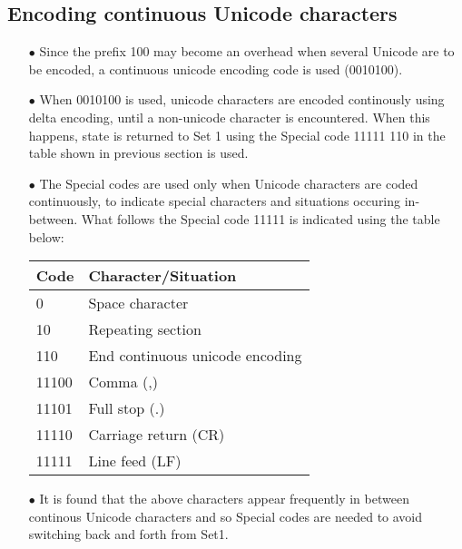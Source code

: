 \documentclass[]{article}
\begin{document}
\subsection{Encoding continuous Unicode characters}
\begin{itemize}
	\item[$\bullet$] Since the prefix 100 may become an overhead when several Unicode are to be encoded, a continuous unicode encoding code is used (0010100).
	\item[$\bullet$] When 0010100 is used, unicode characters are encoded continously using delta encoding, until a non-unicode character is encountered.  When this happens, state is returned to Set 1 using the Special code 11111 110 in the table shown in previous section is used.
	\item[$\bullet$] The Special codes are used only when Unicode characters are coded continuously, to indicate special characters and situations occuring in-between. What follows the Special code 11111 is indicated using the table below:
	\item[] \begin{tabular}{ | l | l |} \hline
	﻿\textbf{Code} & ﻿\textbf{Character/Situation} \\ \hline
	0 & Space character \\ \hline
	10 & Repeating section \\ \hline
	110 & End continuous unicode encoding \\ \hline
	11100 & Comma (,) \\ \hline
	11101 & Full stop (.) \\ \hline
	11110 & Carriage return (CR) \\ \hline
	11111 & Line feed (LF) \\ \hline
    \end{tabular}
	\item[$\bullet$] It is found that the above characters appear frequently in between continous Unicode characters and so Special codes are needed to avoid switching back and forth from Set1.
\end{itemize}
\end{document}
